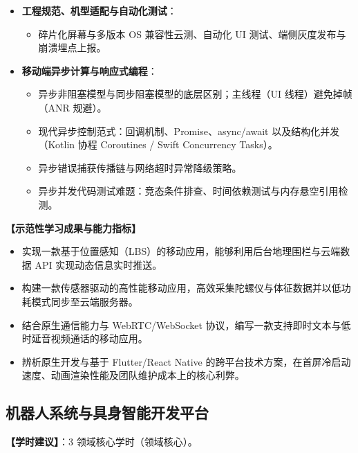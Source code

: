 \begin{itemize}
\begin{itemize}
        \item \textbf{实时通讯与系统级通道}：移动电话通信、VoIP 低时延流媒体、系统级推送机制。
        \item \textbf{移动端增强现实}（AR）：基于 ARKit/ARCore 的平面检测、六自由度（6DoF）空间定位与虚拟物体虚实遮挡融合。
    \end{itemize}
    \item \textbf{工程规范、机型适配与自动化测试}：
    \begin{itemize}
        \item 碎片化屏幕与多版本 OS 兼容性云测、自动化 UI 测试、端侧灰度发布与崩溃埋点上报。
    \end{itemize}
    \item \textbf{移动端异步计算与响应式编程}：
    \begin{itemize}
        \item 异步非阻塞模型与同步阻塞模型的底层区别；主线程（UI 线程）避免掉帧（ANR 规避）。
        \item 现代异步控制范式：回调机制、Promise、async/await 以及结构化并发（Kotlin 协程 Coroutines / Swift Concurrency Tasks）。
        \item 异步错误捕获传播链与网络超时异常降级策略。
        \item 异步并发代码测试难题：竞态条件排查、时间依赖测试与内存悬空引用检测。
    \end{itemize}
\end{itemize}

\textbf{【示范性学习成果与能力指标】}
\begin{itemize}
    \item 实现一款基于位置感知（LBS）的移动应用，能够利用后台地理围栏与云端数据 API 实现动态信息实时推送。
    \item 构建一款传感器驱动的高性能移动应用，高效采集陀螺仪与体征数据并以低功耗模式同步至云端服务器。
    \item 结合原生通信能力与 WebRTC/WebSocket 协议，编写一款支持即时文本与低时延音视频通话的移动应用。
    \item 辨析原生开发与基于 Flutter/React Native 的跨平台技术方案，在首屏冷启动速度、动画渲染性能及团队维护成本上的核心利弊。
\end{itemize}

\subsection{机器人系统与具身智能开发平台}
\textbf{【学时建议】}：3 领域核心学时（领域核心）。

